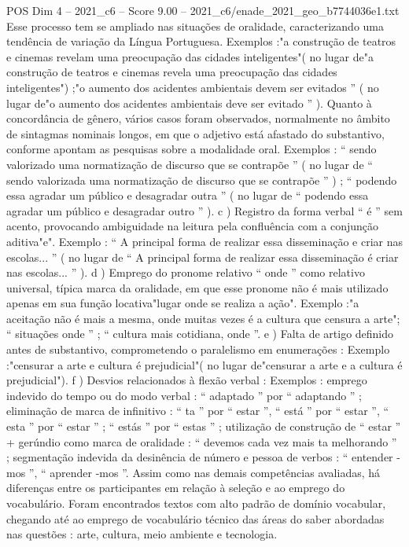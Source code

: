 \begin{textsample}{POS Dim 4 – 2021\_c6 – Score 9.00 – 2021\_c6/enade\_2021\_geo\_b7744036e1.txt}
Esse processo tem se ampliado nas situações de oralidade, caracterizando uma tendência de variação da Língua Portuguesa.
Exemplos :"a construção de teatros e cinemas revelam uma preocupação das cidades inteligentes"( no lugar de"a construção de teatros e cinemas revela uma preocupação das cidades inteligentes") ;"o aumento dos acidentes ambientais devem ser evitados ” ( no lugar de"o aumento dos acidentes ambientais deve ser evitado ” ).
Quanto à concordância de gênero, vários casos foram observados, normalmente no âmbito de sintagmas nominais longos, em que o adjetivo está afastado do substantivo, conforme apontam as pesquisas sobre a modalidade oral.
Exemplos : “ sendo valorizado uma normatização de discurso que se contrapõe ” ( no lugar de “ sendo valorizada uma normatização de discurso que se contrapõe ” ) ; “ podendo essa agradar um público e desagradar outra ” ( no lugar de “ podendo essa agradar um público e desagradar outro ” ). c ) Registro da forma verbal “ é ” sem acento, provocando ambiguidade na leitura pela confluência com a conjunção aditiva"e".
Exemplo : “ A principal forma de realizar essa disseminação e criar nas escolas... ” ( no lugar de “ A principal forma de realizar essa disseminação é criar nas escolas... ” ). d ) Emprego do pronome relativo “ onde ” como relativo universal, típica marca da oralidade, em que esse pronome não é mais utilizado apenas em sua função locativa"lugar onde se realiza a ação".
Exemplo :"a aceitação não é mais a mesma, onde muitas vezes é a cultura que censura a arte"; “ situações onde ” ; “ cultura mais cotidiana, onde ”. e ) Falta de artigo definido antes de substantivo, comprometendo o paralelismo em enumerações : Exemplo :"censurar a arte e cultura é prejudicial"( no lugar de"censurar a arte e a cultura é prejudicial"). f ) Desvios relacionados à flexão verbal : Exemplos : emprego indevido do tempo ou do modo verbal : “ adaptado ” por “ adaptando ” ; eliminação de marca de infinitivo : “ ta ” por “ estar ”, “ está ” por “ estar ”, “ esta ” por “ estar ” ; “ estás ” por “ estas ” ; utilização de construção de “ estar ” + gerúndio como marca de oralidade : “ devemos cada vez mais ta melhorando ” ; segmentação indevida da desinência de número e pessoa de verbos : “ entender -mos ”, “ aprender -mos ”.
Assim como nas demais competências avaliadas, há diferenças entre os participantes em relação à seleção e ao emprego do vocabulário.
Foram encontrados textos com alto padrão de domínio vocabular, chegando até ao emprego de vocabulário técnico das áreas do saber abordadas nas questões : arte, cultura, meio ambiente e tecnologia.

\end{textsample}
